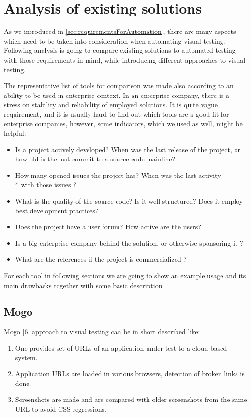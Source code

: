 \documentclass[11pt,oneside,final]{fithesis2}
\begin{document}
    
\chapter{Analysis of existing solutions}
As we introduced in \ref{sec:requirementsForAutomation}, there are many aspects which need to be taken into consideration when automating visual
testing. Following analysis is going to compare existing solutions to automated testing with those requirements in mind, while introducing
different approaches to visual testing.

The representative list of tools for comparison was made also according to an ability to be used in enterprise context. In an enterprise company, there
is a stress on stability and reliability of employed solutions. It is quite vague requirement, and it is usually hard to find out which tools
are a good fit for enterprise companies, however, some indicators, which we used as well, might be helpful:
\begin{itemize}
 \item Is a project actively developed? When was the last release of the project, or how old is the last commit to a source code mainline?
 \item How many opened issues the project has? When was the last activity \\* with those issues ?
 \item What is the quality of the source code? Is it well structured? Does it employ best development practices?
 \item Does the project have a user forum? How active are the users?
 \item Is a big enterprise company behind the solution, or otherwise sponsoring it ?
 \item What are the references if the project is commercialized ?
\end{itemize}

For each tool in following sections we are going to show an example usage and its main drawbacks together with some basic description.
  
  \section{Mogo}
  Mogo [6] approach to visual testing can be in short described like: 
  \begin{enumerate}
   \item One provides set of URLs of an application under test to a cloud based system.
   \item Application URLs are loaded in various browsers, detection of broken links is done.
   \item Screenshots are made and are compared with older screenshots from the same URL to avoid CSS regressions.
  \end{enumerate}
  
\end{document}
